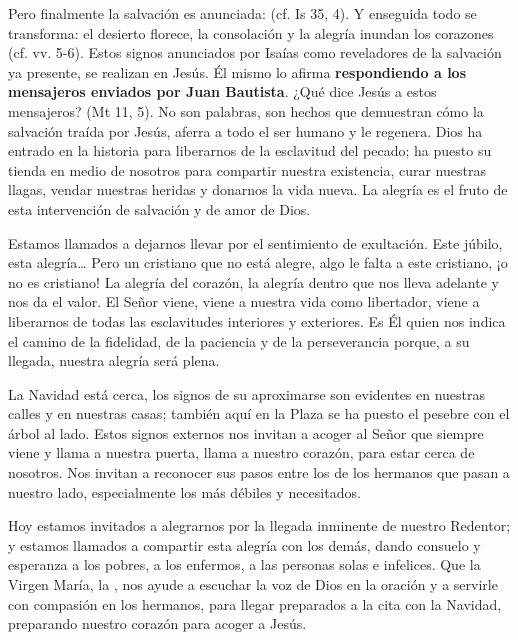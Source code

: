\begin{body}
\begin{body}
Pero finalmente la salvación es anunciada:  (cf. Is 35, 4). Y enseguida todo se transforma: el desierto florece, la consolación y la alegría inundan los corazones (cf. vv. 5-6). Estos signos anunciados por Isaías como reveladores de la salvación ya presente, se realizan en Jesús. Él mismo lo afirma \textbf{respondiendo a los mensajeros enviados por Juan Bautista}. ¿Qué dice Jesús a estos mensajeros?  (Mt 11, 5). No son palabras, son hechos que demuestran cómo la salvación traída por Jesús, aferra a todo el ser humano y le regenera. Dios ha entrado en la historia para liberarnos de la esclavitud del pecado; ha puesto su tienda en medio de nosotros para compartir nuestra existencia, curar nuestras llagas, vendar nuestras heridas y donarnos la vida nueva. La alegría es el fruto de esta intervención de salvación y de amor de Dios.

Estamos llamados a dejarnos llevar por el sentimiento de exultación. Este júbilo, esta alegría\ldots{} Pero un cristiano que no está alegre, algo le falta a este cristiano, ¡o no es cristiano! La alegría del corazón, la alegría dentro que nos lleva adelante y nos da el valor. El Señor viene, viene a nuestra vida como libertador, viene a liberarnos de todas las esclavitudes interiores y exteriores. Es Él quien nos indica el camino de la fidelidad, de la paciencia y de la perseverancia porque, a su llegada, nuestra alegría será plena.

La Navidad está cerca, los signos de su aproximarse son evidentes en nuestras calles y en nuestras casas; también aquí en la Plaza se ha puesto el pesebre con el árbol al lado. Estos signos externos nos invitan a acoger al Señor que siempre viene y llama a nuestra puerta, llama a nuestro corazón, para estar cerca de nosotros. Nos invitan a reconocer sus pasos entre los de los hermanos que pasan a nuestro lado, especialmente los más débiles y necesitados.

Hoy estamos invitados a alegrarnos por la llegada inminente de nuestro Redentor; y estamos llamados a compartir esta alegría con los demás, dando consuelo y esperanza a los pobres, a los enfermos, a las personas solas e infelices. Que la Virgen María, la , nos ayude a escuchar la voz de Dios en la oración y a servirle con compasión en los hermanos, para llegar preparados a la cita con la Navidad, preparando nuestro corazón para acoger a Jesús.



\end{body}
\end{body}
